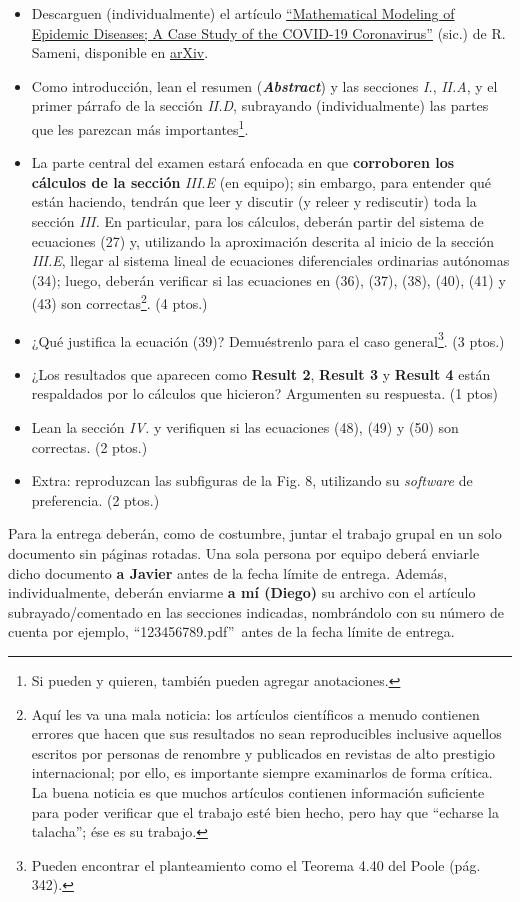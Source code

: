 \documentclass[a4paper]{article}
\begin{document}
\begin{itemize}
    \item Descarguen (individualmente) el artículo \href{https://arxiv.org/abs/2003.11371}{``Mathematical Modeling of Epidemic Diseases; A Case Study of the COVID-19 Coronavirus''} (sic.) de R. Sameni, disponible en \href{https://arxiv.org}{arXiv}.
    \item Como introducción, lean el resumen (\emph{\textbf{Abstract}}) y las secciones \emph{I.}, \emph{II.A}, y el primer párrafo de la sección \emph{II.D}, subrayando (individualmente) las partes que les parezcan más importantes\footnote{Si pueden y quieren, también pueden agregar anotaciones.}.
    \item La parte central del examen estará enfocada en que \textbf{corroboren los cálculos de la sección} \emph{III.E} (en equipo); sin embargo, para entender qué están haciendo, tendrán que leer y discutir (y releer y rediscutir) toda la sección \emph{III.} En particular, para los cálculos, deberán partir del sistema de ecuaciones (27) y, utilizando la aproximación descrita al inicio de la sección \emph{III.E}, llegar al sistema lineal de ecuaciones diferenciales ordinarias autónomas (34); luego, deberán verificar si las ecuaciones en (36), (37), (38), (40), (41) y (43) son correctas\footnote{Aquí les va una mala noticia: los artículos científicos a menudo contienen errores que hacen que sus resultados no sean reproducibles \textemdash inclusive aquellos escritos por personas de renombre y publicados en revistas de alto prestigio internacional\textemdash; por ello, es importante siempre examinarlos de forma crítica. La buena noticia es que muchos artículos contienen información suficiente para poder verificar que el trabajo esté bien hecho, pero hay que ``echarse la talacha''; ése es su trabajo.}. (4 ptos.)
    \item ¿Qué justifica la ecuación (39)? Demuéstrenlo para el caso general\footnote{Pueden encontrar el planteamiento como el Teorema 4.40 del Poole (pág. 342).}. (3 ptos.)
    \item ¿Los resultados que aparecen como \textbf{Result 2}, \textbf{Result 3} y \textbf{Result 4} están respaldados por lo cálculos que hicieron? Argumenten su respuesta. (1 ptos)
    \item Lean la sección \emph{IV.} y verifiquen si las ecuaciones (48), (49) y (50) son correctas. (2 ptos.)
    \item Extra: reproduzcan las subfiguras de la Fig. 8, utilizando su \emph{software} de preferencia. (2 ptos.)
\end{itemize}

Para la entrega deberán, como de costumbre, juntar el trabajo grupal en un solo documento sin páginas rotadas. Una sola persona por equipo deberá enviarle dicho documento \textbf{a Javier} antes de la fecha límite de entrega. Además, individualmente, deberán enviarme \textbf{a mí (Diego)} su archivo con el artículo subrayado/comentado en las secciones indicadas, nombrándolo con su número de cuenta \textemdash por ejemplo, ``123456789.pdf''\textemdash  \ antes de la fecha límite de entrega.
\end{document}
